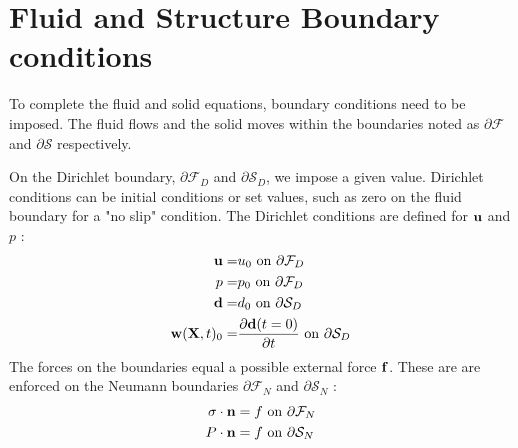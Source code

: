 \section{Fluid and Structure Boundary conditions}
To complete the fluid and solid equations, boundary conditions need to be imposed. The fluid flows and the solid moves within the boundaries noted as $ \partial\mathcal{F}$ and $ \partial \mathcal{S}$ respectively. 

On the Dirichlet boundary, $ \partial \mathcal{F}_D$ and $ \partial \mathcal{S}_D$, we impose a given value. Dirichlet conditions can be initial conditions or set values, such as zero on the fluid boundary for a "no slip" condition. The Dirichlet conditions are defined for $\bold{u}$ and $p$ :
\begin{align}
\bold{u} =& u_0 \text{   on   } \partial \mathcal{F}_D  \\
p =& p_0 \text{   on   } \partial \mathcal{F}_D  \\
\bold{d} =& d_0 \text{ on   } \partial \mathcal{S}_D  \\
\bold{w}(\textbf{X},t)_0 =& \frac{\partial \bold{d}(t=0)}{\partial t} \text{   on   } \partial \mathcal{S}_D   
\end{align}
The forces on the boundaries equal a possible external force $ \bold{f}$. These are are enforced on the Neumann boundaries $\partial \mathcal{F}_N$ and  $\partial \mathcal{S}_N$ :
\begin{align}
\sigma \cdot \bold{n} &= f \text{   on   } \partial \mathcal{F}_N \\   
P\cdot \bold{n} &= f \text{   on   } \partial \mathcal{S}_N    
\end{align}
